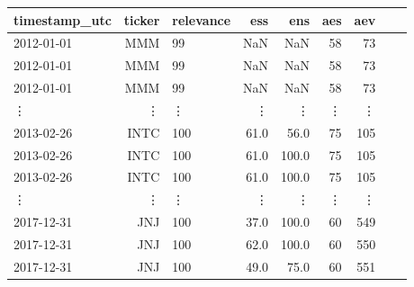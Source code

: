 \begin{tabular}{lrlrrrrrl}
\toprule
timestamp\_utc & ticker &  relevance &   ess &    ens &  aes &  aev \\
\midrule
2012-01-01    &    MMM &         99 &   NaN &    NaN &   58 &   73 \\
2012-01-01    &    MMM &         99 &   NaN &    NaN &   58 &   73 \\
2012-01-01    &    MMM &         99 &   NaN &    NaN &   58 &   73 \\
\vdots        & \vdots &     \vdots & \vdots & \vdots & \vdots & \vdots \\
2013-02-26    &   INTC &        100 &  61.0 &   56.0 &   75 &  105 \\
2013-02-26    &   INTC &        100 &  61.0 &  100.0 &   75 &  105 \\
2013-02-26    &   INTC &        100 &  61.0 &  100.0 &   75 &  105 \\
\vdots        & \vdots &     \vdots & \vdots & \vdots & \vdots & \vdots \\
2017-12-31    &    JNJ &        100 &  37.0 &  100.0 &   60 &  549 \\
2017-12-31    &    JNJ &        100 &  62.0 &  100.0 &   60 &  550 \\
2017-12-31    &    JNJ &        100 &  49.0 &   75.0 &   60 &  551 \\
\bottomrule
\end{tabular}

